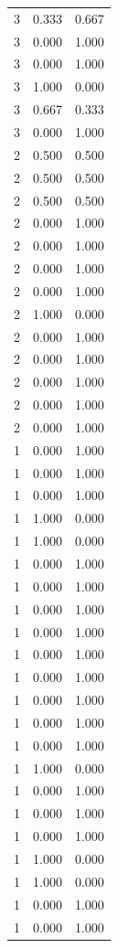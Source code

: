 \begin{tabular}{rrr}
3 & 0.333 & 0.667 \\
3 & 0.000 & 1.000 \\
3 & 0.000 & 1.000 \\
3 & 1.000 & 0.000 \\
3 & 0.667 & 0.333 \\
3 & 0.000 & 1.000 \\
2 & 0.500 & 0.500 \\
2 & 0.500 & 0.500 \\
2 & 0.500 & 0.500 \\
2 & 0.000 & 1.000 \\
2 & 0.000 & 1.000 \\
2 & 0.000 & 1.000 \\
2 & 0.000 & 1.000 \\
2 & 1.000 & 0.000 \\
2 & 0.000 & 1.000 \\
2 & 0.000 & 1.000 \\
2 & 0.000 & 1.000 \\
2 & 0.000 & 1.000 \\
2 & 0.000 & 1.000 \\
1 & 0.000 & 1.000 \\
1 & 0.000 & 1.000 \\
1 & 0.000 & 1.000 \\
1 & 1.000 & 0.000 \\
1 & 1.000 & 0.000 \\
1 & 0.000 & 1.000 \\
1 & 0.000 & 1.000 \\
1 & 0.000 & 1.000 \\
1 & 0.000 & 1.000 \\
1 & 0.000 & 1.000 \\
1 & 0.000 & 1.000 \\
1 & 0.000 & 1.000 \\
1 & 0.000 & 1.000 \\
1 & 0.000 & 1.000 \\
1 & 1.000 & 0.000 \\
1 & 0.000 & 1.000 \\
1 & 0.000 & 1.000 \\
1 & 0.000 & 1.000 \\
1 & 1.000 & 0.000 \\
1 & 1.000 & 0.000 \\
1 & 0.000 & 1.000 \\
1 & 0.000 & 1.000 \\
\bottomrule
\end{tabular}
